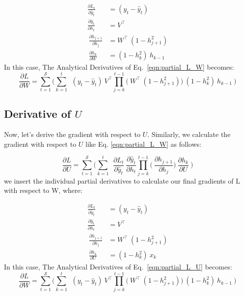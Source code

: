 \documentclass{article}
\begin{document}
\begin{align*}
        \frac{\partial L_t}{\partial \hat{y}_t} &= (y_t - \hat{y}_t)\\
        \frac{\partial \hat{y}_t}{\partial h_t}
        &= V^\top \\
        ~\frac{\partial h_{j+1}}{\partial h_{j}}
        &= W^\top ~ (1 - h_{j+1}^2) \\
        ~\frac{\partial h_k}{\partial W}&= (1-h_k^2)~ h_{k-1}
\end{align*}
In this case, The Analytical Derivatives of Eq.~\eqref{eqn:partial_L_W} becomes:
\begin{equation}
	\frac{\partial L}{ \partial{W}} = \sum_{t=1}^{\mathcal{S}} 
	\bigg(	
	 \sum_{k=1}^{t} ~
	~(y_t - \hat{y}_t)
	~V^\top
        \prod_{j=k}^{t-1} \bigg(
	~W^\top ~ (1 - h_{j+1}^2)
        \bigg)
	~(1-h_k^2)~ h_{k-1}~
	\bigg) 
 \label{eqn:partial_L_aW}
\end{equation}
\subsection{Derivative of $U$}
Now, let's derive the gradient with respect to $U$. Similarly, we calculate the gradient with respect to $U$  like Eq. \eqref{eqn:partial_L_W}  as follows:

\begin{equation}
	\frac{\partial L}{ \partial{U}} = \sum_{t=1}^{\mathcal{S}} 
	\bigg(	
	 \sum_{k=1}^{t} ~
	~\frac{\partial L_t}{\partial \hat{y}_t}
	~\frac{\partial \hat{y}_t}{\partial h_t}
        \prod_{j=k}^{t-1} \bigg(
	~\frac{\partial h_{j+1}}{\partial h_{j}}
        \bigg)
	~\frac{\partial h_k}{\partial U}~
	\bigg) 
 \label{eqn:partial_L_U}
\end{equation}
we insert the individual partial derivatives to calculate our final gradients of L with respect to W, where:

\begin{align*}
        \frac{\partial L_t}{\partial \hat{y}_t} &= (y_t - \hat{y}_t)\\
        \frac{\partial \hat{y}_t}{\partial h_t}
        &= V^\top \\
        ~\frac{\partial h_{j+1}}{\partial h_{j}}
        &= W^\top ~ (1 - h_{j+1}^2) \\
        ~\frac{\partial h_k}{\partial U}&= (1-h_k^2)~ x_{k}
\end{align*}
In this case, The Analytical Derivatives of Eq.~\eqref{eqn:partial_L_U} becomes:
\begin{equation}
	\frac{\partial L}{ \partial{W}} = \sum_{t=1}^{\mathcal{S}} 
	\bigg(	
	 \sum_{k=1}^{t} ~
	~(y_t - \hat{y}_t)
	~V^\top
        \prod_{j=k}^{t-1} \bigg(
	~W^\top ~ (1 - h_{j+1}^2)
        \bigg)
	~(1-h_k^2)~ h_{k-1}~
	\bigg) 
 \label{eqn:partial_L_aU}
\end{equation}
\end{document}
